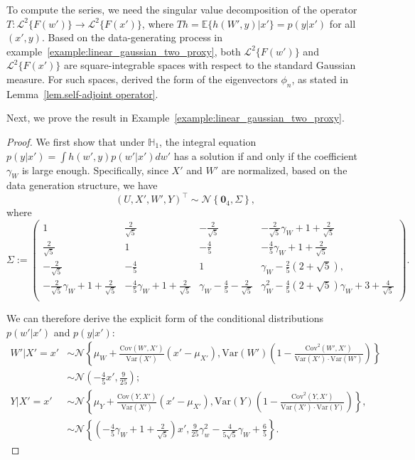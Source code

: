 \documentclass[
  12pt]{article}
\def\to{\rightarrow}
\def\mH{\mathbb{H}}
\def\cN{\mathcal{N}}
\begin{document}
To compute the series, we need the singular value decomposition of the operator $ T: \mathcal{L}^2\{F(w')\} \to \mathcal{L}^2\{F(x')\} $, where $Th = \mathbb{E}\{ h(W', y) | x'\} = p(y|x') $ for all $(x', y)$. Based on the data-generating process in example~\ref{example:linear_gaussian_two_proxy}, both $ \mathcal{L}^2\{F(w')\}$ and $\mathcal{L}^2\{F(x')\}$ are square-integrable spaces with respect to the standard Gaussian measure. For such spaces, \cite{carrasco2007linear} derived the form of the eigenvectors $\phi_n$, as stated in Lemma~\ref{lem.self-adjoint operator}.
    
Next, we prove the result in Example~\ref{example:linear_gaussian_two_proxy}. 

\examplelineargaussian*
\begin{proof}
    We first show that under $\mH_1$, the integral equation $p(y|x')=\int{h(w',y)p(w'|x')dw'}$ has a solution if and only if the coefficient $\gamma_W$ is large enough. Specifically, since $X'$ and $W'$ are normalized, based on the data generation structure, we have
$$
\left( U,X',W',Y \right)^\top \sim \cN\left\{ \bm{0}_4, \Sigma \right\}, 
$$
where 
\begin{equation*}
    \Sigma := \left( \begin{array}{cccc}
	1&		\frac{2}{\sqrt{5}}&		-\frac{2}{\sqrt{5}}&		-\frac{2}{\sqrt{5}}\gamma_W+1+\frac{2}{\sqrt{5}}\\
	\frac{2}{\sqrt{5}}&		1&		-\frac{4}{5}&		-\frac{4}{5}\gamma_W+1+\frac{2}{\sqrt{5}}\\
	-\frac{2}{\sqrt{5}}&		-\frac{4}{5}&		1&		\gamma_W-\frac{2}{5}( 2+\sqrt{5} ),\\
	-\frac{2}{\sqrt{5}}\gamma_W+1+\frac{2}{\sqrt{5}}&		-\frac{4}{5}\gamma_W+1+\frac{2}{\sqrt{5}}&		\gamma_W-\frac{4}{5}-\frac{2}{\sqrt{5}}&		\gamma^2_W-\frac{4}{5}( 2+\sqrt{5}) \gamma_W+3+\frac{4}{\sqrt{5}}\\
\end{array} \right).
\end{equation*}

We can therefore derive the explicit form of the conditional distributions $p(w'|x')$ and $p(y|x')$: 
\begin{align}
    W'|X'=x' &\sim \cN\left\{ \mu_W+\frac{\mathrm{Cov}(W',X')}{\mathrm{Var}(X')}(x'-\mu_{X'}),\mathrm{Var}(W')\left( 1-\frac{\mathrm{Cov}^2(W',X')}{\mathrm{Var}(X')\cdot \mathrm{Var}(W')} \right) \right\} \nonumber \\
	 &\sim \cN\left( -\frac{4}{5}x',\frac{9}{25} \right); \nonumber \\
     Y|X'=x'&\sim \cN\left\{ \mu_Y+\frac{\mathrm{Cov}(Y,X')}{\mathrm{Var}(X')}(x'-\mu_{X'}),\mathrm{Var}(Y)\left( 1-\frac{\mathrm{Cov}^2(Y,X')}{\mathrm{Var}(X')\cdot \mathrm{Var}(Y)} \right) \right\}, \nonumber \\
	&\sim \cN\left\{ \left( -\frac{4}{5}\gamma_W+1+\frac{2}{\sqrt{5}} \right) x',\frac{9}{25}\gamma_{w}^{2}-\frac{4}{5\sqrt{5}}\gamma_W+\frac{6}{5} \right\}. \label{eq.Y_given_X}
\end{align}
	


\end{proof}
\end{document}
